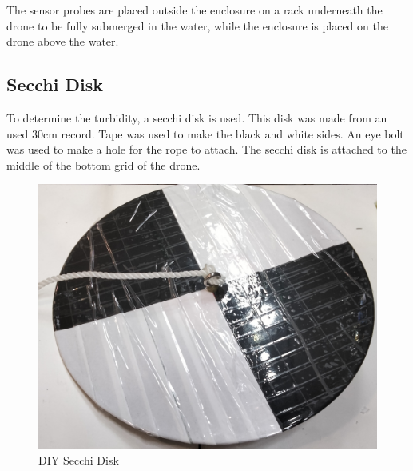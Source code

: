 The sensor probes are placed outside the enclosure on a rack underneath the drone to be fully submerged in the water, while the enclosure is placed on the drone above the water.

\newpage
\subsection{Secchi Disk}
To determine the turbidity, a secchi disk is used. This disk was made from an used 30cm record. Tape was used to make the black and white sides. An eye bolt was used to make a hole for the rope to attach. The secchi disk is attached to the middle of the bottom grid of the drone.

\begin{figure}[h]
\centering
\includegraphics[scale=0.1]{53_secchi.jpg}
\caption{DIY Secchi Disk}
\end{figure}